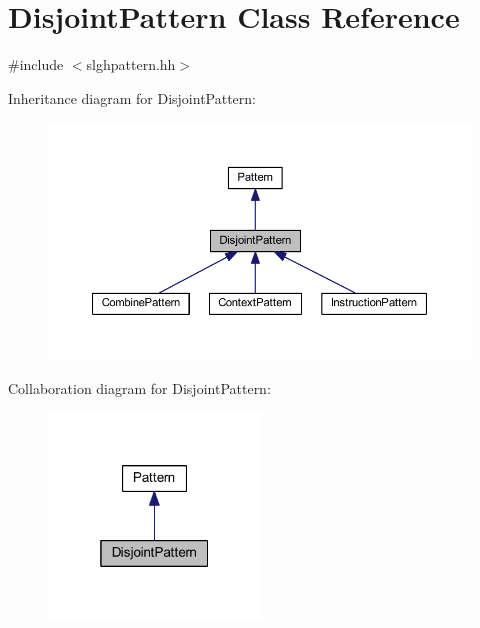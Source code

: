 \hypertarget{class_disjoint_pattern}{}\section{Disjoint\+Pattern Class Reference}
\label{class_disjoint_pattern}


{\ttfamily \#include $<$slghpattern.\+hh$>$}



Inheritance diagram for Disjoint\+Pattern\+:
\nopagebreak
\begin{figure}[H]
\begin{center}
\leavevmode
\includegraphics[width=350pt]{class_disjoint_pattern__inherit__graph}
\end{center}
\end{figure}


Collaboration diagram for Disjoint\+Pattern\+:
\nopagebreak
\begin{figure}[H]
\begin{center}
\leavevmode
\includegraphics[width=160pt]{class_disjoint_pattern__coll__graph}
\end{center}
\end{figure}
